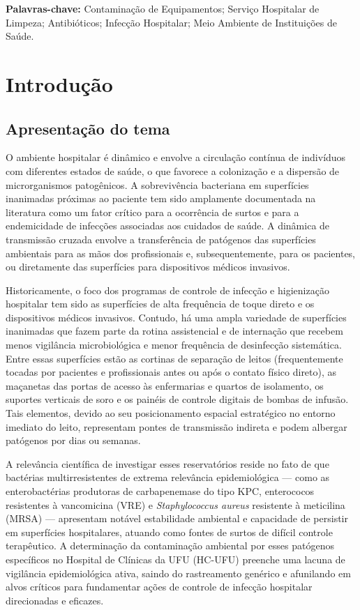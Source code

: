 \documentclass[12pt,a4paper]{article}
\begin{document}
\vspace{12pt}
\noindent \textbf{Palavras-chave:} Contaminação de Equipamentos; Serviço Hospitalar de Limpeza; Antibióticos; Infecção Hospitalar; Meio Ambiente de Instituições de Saúde.
\newpage

\section{Introdução}

\subsection{Apresentação do tema}
O ambiente hospitalar é dinâmico e envolve a circulação contínua de indivíduos com diferentes estados de saúde, o que favorece a colonização e a dispersão de microrganismos patogênicos. A sobrevivência bacteriana em superfícies inanimadas próximas ao paciente tem sido amplamente documentada na literatura como um fator crítico para a ocorrência de surtos e para a endemicidade de infecções associadas aos cuidados de saúde. A dinâmica de transmissão cruzada envolve a transferência de patógenos das superfícies ambientais para as mãos dos profissionais e, subsequentemente, para os pacientes, ou diretamente das superfícies para dispositivos médicos invasivos.

Historicamente, o foco dos programas de controle de infecção e higienização hospitalar tem sido as superfícies de alta frequência de toque direto e os dispositivos médicos invasivos. Contudo, há uma ampla variedade de superfícies inanimadas que fazem parte da rotina assistencial e de internação que recebem menos vigilância microbiológica e menor frequência de desinfecção sistemática. Entre essas superfícies estão as cortinas de separação de leitos (frequentemente tocadas por pacientes e profissionais antes ou após o contato físico direto), as maçanetas das portas de acesso às enfermarias e quartos de isolamento, os suportes verticais de soro e os painéis de controle digitais de bombas de infusão. Tais elementos, devido ao seu posicionamento espacial estratégico no entorno imediato do leito, representam pontes de transmissão indireta e podem albergar patógenos por dias ou semanas.

A relevância científica de investigar esses reservatórios reside no fato de que bactérias multirresistentes de extrema relevância epidemiológica --- como as enterobactérias produtoras de carbapenemase do tipo KPC, enterococos resistentes à vancomicina (VRE) e \textit{Staphylococcus aureus} resistente à meticilina (MRSA) --- apresentam notável estabilidade ambiental e capacidade de persistir em superfícies hospitalares, atuando como fontes de surtos de difícil controle terapêutico. A determinação da contaminação ambiental por esses patógenos específicos no Hospital de Clínicas da UFU (HC-UFU) preenche uma lacuna de vigilância epidemiológica ativa, saindo do rastreamento genérico e afunilando em alvos críticos para fundamentar ações de controle de infecção hospitalar direcionadas e eficazes.
\end{document}
